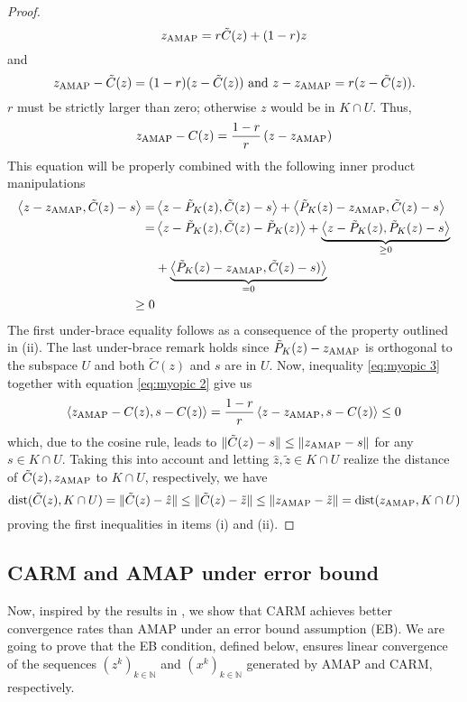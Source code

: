\documentclass[smallextended,numbook,nospthms]{svjour3}
\theoremstyle{plain}
\theoremstyle{definition}
\def\NN{\mathds N}
\DeclareMathOperator{\dist}{dist}
\newcommand{\scal}[2]{\left\langle{#1},{#2}  \right\rangle}
\newcommand{\AMAP}{{\rm AMAP}}
\begin{document}
\begin{proof}
	\begin{equation}
		z_{\AMAP}=r\tilde{C}(z)+(1-r)z
	\end{equation}
	and
	\begin{equation}
		z_{\AMAP}-\tilde{C}(z)=(1-r)(z-\tilde{C}(z)) \text { and } z-z_{\AMAP}=r(z-\tilde{C}(z)).
	\end{equation}
	$r$ must be strictly larger than zero;  otherwise $z$ would be in $K \cap U$. Thus,
	\begin{equation}\label{eq:myopic 2}
		z_{\AMAP}-C(z)=\frac{1-r}{r}\left(z-z_{\AMAP}\right)
	\end{equation}
	This equation will be properly combined with the following inner product manipulations
	\begin{align}
		\scal{z-z_{\AMAP}}{\tilde{C}(z)-s}=&\scal{z-\tilde{P}_{K}(z)}{\tilde{C}(z)-s}+\scal{\tilde{P}_{K}(z)-z_{\AMAP}}{\tilde{C}(z)-s} \notag \\
		=&\scal{z-\tilde{P}_{K}(z)}{\tilde{C}(z)-\tilde{P}_{K}(z)}+\underbrace{\scal{z-\tilde{P}_{K}(z)}{\tilde{P}_{K}(z)-s}}_{\geq 0} \notag \\
		&+\underbrace{\scal{\tilde{P}_{K}(z)-z_{\AMAP}}{\tilde{C}(z)-s)}}_{=0}  \\
		\geq 0\label{eq:myopic 3}
	\end{align}
	The first under-brace equality follows as a consequence of the property outlined in (ii). The last under-brace remark holds since $\tilde{P}_{K}(z)-z_{\AMAP}$ is orthogonal to the subspace $U$ and both $\tilde{C}(z)$ and $s$ are in $U $. Now, inequality \cref{eq:myopic 3} together with equation \cref{eq:myopic 2} give us
	\begin{equation}
		\scal{z_{\AMAP}-C(z)}{s-C(z)}=\frac{1-r}{r}\scal{z-z_{\AMAP}}{s-C(z)} \leq 0
	\end{equation}
	which, due to the cosine rule, leads to $\|\tilde{C}(z)-s\| \leq\|z_{\AMAP}-s\|$ for any $s \in K \cap U$. Taking this into account and letting $\hat{z}, \tilde{z} \in K \cap U$ realize the distance of $\tilde{C}(z), z_{\AMAP}$ to $K \cap U$, respectively, we have
	\begin{equation}
		\dist(\tilde{C}(z), K \cap U)=\|\tilde{C}(z)-\hat{z}\| \leq\|\tilde{C}(z)-\tilde{z}\| \leq\|z_{\AMAP}-\tilde{z}\|=\dist(z _{\AMAP}, K \cap U)	
	\end{equation}
	proving the first inequalities in items (i) and (ii).
\end{proof}

\subsection{CARM and AMAP under error bound}\label{subsec:comp EB}
Now, inspired by the results in \cite{Arefidamghani:2020}, we show that CARM achieves better convergence rates than AMAP under an error bound assumption (EB). We are going to prove that the EB condition, defined below, ensures linear convergence of the sequences $\left(z^{k}\right)_{k \in \NN}$ and $\left(x^{k}\right)_{k \in \NN}$ generated by AMAP and CARM, respectively.
\end{document}
